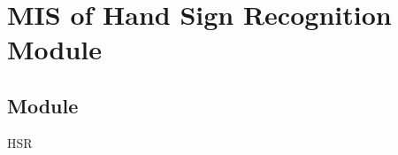 \documentclass[12pt, titlepage]{article}
\begin{document}

\section{MIS of Hand Sign Recognition Module} \label{Module} 
\subsection{Module}
HSR
\end{document}
